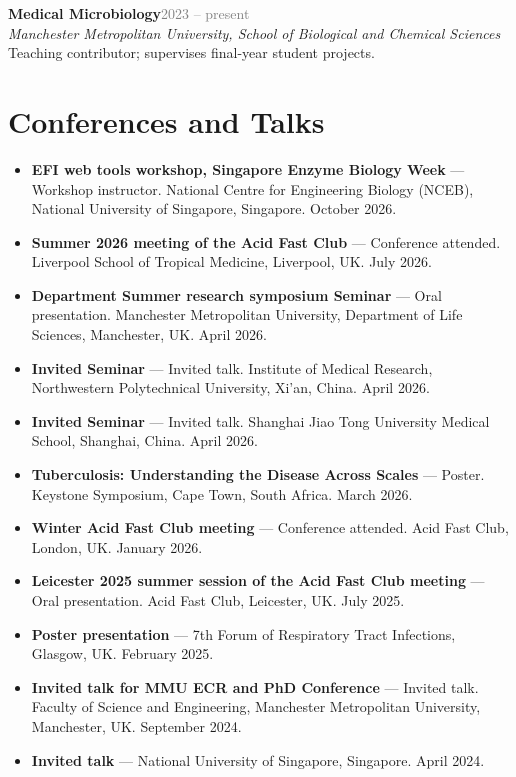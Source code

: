 \documentclass[10pt,a4paper]{article}
\newcommand{\cvdate}[1]{\textcolor{graytext}{\small #1}}
\newcommand{\cventry}[4]{%
  \noindent\textbf{#1}\hfill\cvdate{#2}\\
  \textit{#3}\\
  #4\par\vspace{0.4em}
}
\begin{document}
\cventry{Medical Microbiology}{2023 -- present}
  {Manchester Metropolitan University, School of Biological and Chemical Sciences}
  {Teaching contributor; supervises final-year student projects.}

\section*{Conferences and Talks}

\begin{itemize}[leftmargin=1.1em]
\item \textbf{EFI web tools workshop, Singapore Enzyme Biology Week} --- Workshop instructor. National Centre for Engineering Biology (NCEB), National University of Singapore, Singapore. October 2026.
\item \textbf{Summer 2026 meeting of the Acid Fast Club} --- Conference attended. Liverpool School of Tropical Medicine, Liverpool, UK. July 2026.
\item \textbf{Department Summer research symposium Seminar} --- Oral presentation. Manchester Metropolitan University, Department of Life Sciences, Manchester, UK. April 2026.
\item \textbf{Invited Seminar} --- Invited talk. Institute of Medical Research, Northwestern Polytechnical University, Xi'an, China. April 2026.
\item \textbf{Invited Seminar} --- Invited talk. Shanghai Jiao Tong University Medical School, Shanghai, China. April 2026.
\item \textbf{Tuberculosis: Understanding the Disease Across Scales} --- Poster. Keystone Symposium, Cape Town, South Africa. March 2026.
\item \textbf{Winter Acid Fast Club meeting} --- Conference attended. Acid Fast Club, London, UK. January 2026.
\item \textbf{Leicester 2025 summer session of the Acid Fast Club meeting} --- Oral presentation. Acid Fast Club, Leicester, UK. July 2025.
\item \textbf{Poster presentation} --- 7th Forum of Respiratory Tract Infections, Glasgow, UK. February 2025.
\item \textbf{Invited talk for MMU ECR and PhD Conference} --- Invited talk. Faculty of Science and Engineering, Manchester Metropolitan University, Manchester, UK. September 2024.
\item \textbf{Invited talk} --- National University of Singapore, Singapore. April 2024.

\end{itemize}
\end{document}
